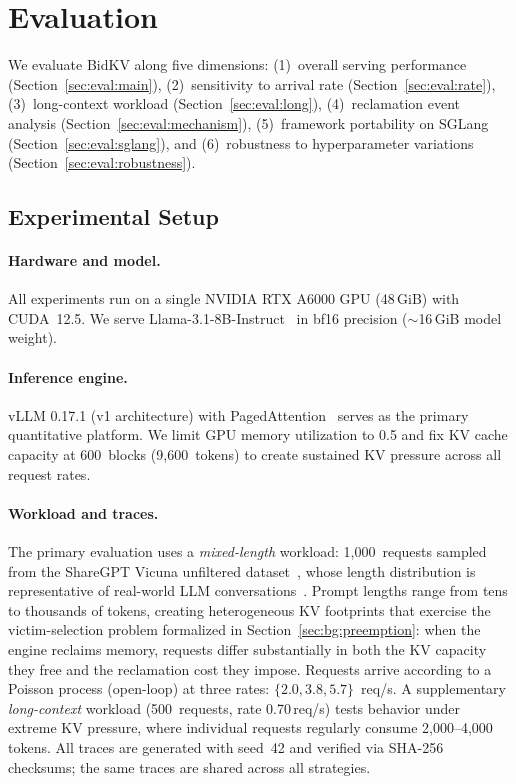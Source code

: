 \documentclass[sigconf,nonacm]{acmart}
\newcommand{\bidkv}{BidKV\xspace}
\begin{document}
\section{Evaluation}\label{sec:eval}

We evaluate \bidkv along five dimensions: (1)~overall serving performance
(Section~\ref{sec:eval:main}), (2)~sensitivity to arrival rate
(Section~\ref{sec:eval:rate}), (3)~long-context workload
(Section~\ref{sec:eval:long}), (4)~reclamation event analysis
(Section~\ref{sec:eval:mechanism}), (5)~framework portability on SGLang
(Section~\ref{sec:eval:sglang}), and (6)~robustness to hyperparameter variations
(Section~\ref{sec:eval:robustness}).

\subsection{Experimental Setup}\label{sec:eval:setup}

\paragraph{Hardware and model.}
All experiments run on a single NVIDIA RTX A6000 GPU (48\,GiB) with CUDA~12.5.
We serve Llama-3.1-8B-Instruct~\cite{Grattafiori2024} in bf16 precision
($\sim$16\,GiB model weight).

\paragraph{Inference engine.}
vLLM 0.17.1 (v1 architecture) with PagedAttention~\cite{Kwon2023} serves as the
primary quantitative platform.  We limit GPU memory utilization to 0.5 and fix
KV cache capacity at 600~blocks (9{,}600~tokens) to create sustained KV
pressure across all request rates.

\paragraph{Workload and traces.}
The primary evaluation uses a \emph{mixed-length} workload: 1{,}000~requests
sampled from the ShareGPT Vicuna unfiltered
dataset~\cite{ShareGPT2023}, whose length distribution is
representative of real-world LLM conversations~\cite{Zheng2024lmsys}.
Prompt lengths range from tens to thousands of tokens, creating heterogeneous
KV footprints that exercise the victim-selection problem formalized in
Section~\ref{sec:bg:preemption}: when the engine reclaims memory, requests differ
substantially in both the KV capacity they free and the reclamation cost they
impose.  Requests arrive according to a Poisson process (open-loop) at three
rates: $\{2.0, 3.8, 5.7\}$~req/s.
A supplementary \emph{long-context} workload (500~requests,
rate 0.70\,req/s) tests behavior under extreme KV pressure, where
individual requests regularly consume 2{,}000--4{,}000 tokens.
All traces are generated with seed~42 and verified via SHA-256 checksums;
the same traces are shared across all strategies.
\end{document}
